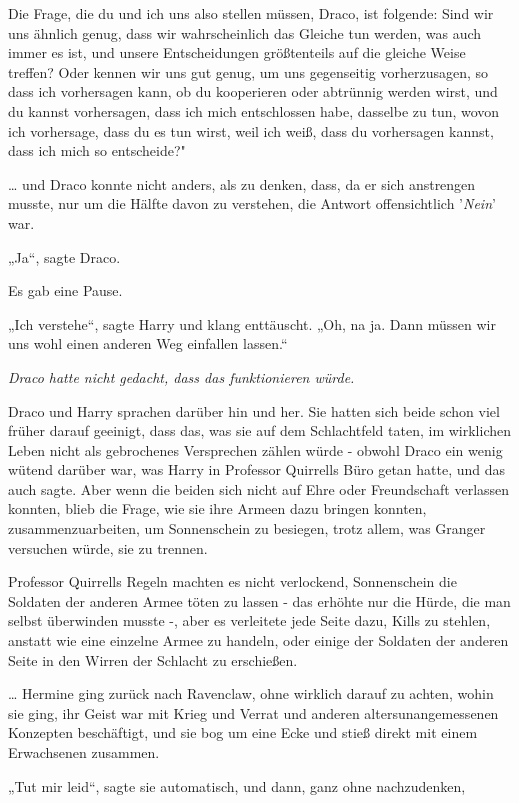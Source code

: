 {Die Frage, die du und ich uns also stellen müssen, Draco, ist folgende: Sind wir uns ähnlich genug, dass wir wahrscheinlich das Gleiche tun werden, was auch immer es ist, und unsere Entscheidungen größtenteils auf die gleiche Weise treffen? Oder kennen wir uns gut genug, um uns gegenseitig vorherzusagen, so dass ich vorhersagen kann, ob du kooperieren oder abtrünnig werden wirst, und du kannst vorhersagen, dass ich mich entschlossen habe, dasselbe zu tun, wovon ich vorhersage, dass du es tun wirst, weil ich weiß, dass du vorhersagen kannst, dass ich mich so entscheide?"

… und Draco konnte nicht anders, als zu denken, dass, da er sich anstrengen musste, nur um die Hälfte davon zu verstehen, die Antwort offensichtlich '\emph{Nein}' war.

„Ja“, sagte Draco.

Es gab eine Pause.

„Ich verstehe“, sagte Harry und klang enttäuscht. „Oh, na ja. Dann müssen wir uns wohl einen anderen Weg einfallen lassen.“

\emph{Draco hatte nicht gedacht, dass das funktionieren würde.}

Draco und Harry sprachen darüber hin und her. Sie hatten sich beide schon viel früher darauf geeinigt, dass das, was sie auf dem Schlachtfeld taten, im wirklichen Leben nicht als gebrochenes Versprechen zählen würde - obwohl Draco ein wenig wütend darüber war, was Harry in Professor Quirrells Büro getan hatte, und das auch sagte. Aber wenn die beiden sich nicht auf Ehre oder Freundschaft verlassen konnten, blieb die Frage, wie sie ihre Armeen dazu bringen konnten, zusammenzuarbeiten, um Sonnenschein zu besiegen, trotz allem, was Granger versuchen würde, sie zu trennen.

Professor Quirrells Regeln machten es nicht verlockend, Sonnenschein die Soldaten der anderen Armee töten zu lassen - das erhöhte nur die Hürde, die man selbst überwinden musste -, aber es verleitete jede Seite dazu, Kills zu stehlen, anstatt wie eine einzelne Armee zu handeln, oder einige der Soldaten der anderen Seite in den Wirren der Schlacht zu erschießen.

… Hermine ging zurück nach Ravenclaw, ohne wirklich darauf zu achten, wohin sie ging, ihr Geist war mit Krieg und Verrat und anderen altersunangemessenen Konzepten beschäftigt, und sie bog um eine Ecke und stieß direkt mit einem Erwachsenen zusammen.

„Tut mir leid“, sagte sie automatisch, und dann, ganz ohne nachzudenken,

}
